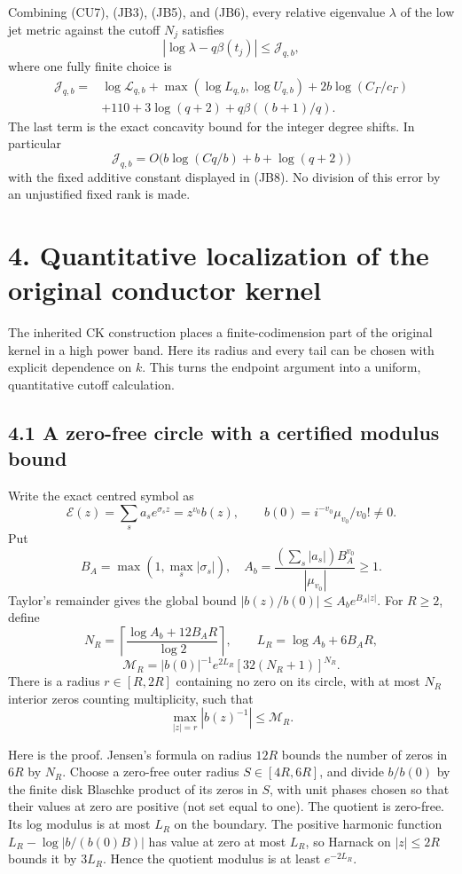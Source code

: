 \documentclass[10pt]{article}
\begin{document}
Combining (CU7), (JB3), (JB5), and (JB6), every relative eigenvalue \(\lambda\) of the low jet metric against the cutoff \(N_j\) satisfies \[
 \boxed{|\log\lambda-q\beta(t_j)|\le\mathcal J_{q,b},}
 \tag{JB7}
\] where one fully finite choice is \[
 \begin{split}
 \mathcal J_{q,b}={}&\log\mathcal L_{q,b}
 +\max(\log L_{q,b},\log U_{q,b})
 +2b\log(C_\Gamma/c_\Gamma)\\
 &+110+3\log(q+2)+q\beta((b+1)/q).
 \end{split}
 \tag{JB8}
\] The last term is the exact concavity bound for the integer degree shifts. In particular \[
 \mathcal J_{q,b}
 =O\bigl(b\log(Cq/b)+b+\log(q+2)\bigr)
\] with the fixed additive constant displayed in (JB8). No division of this error by an unjustified fixed rank is made.

\section{4. Quantitative localization of the original conductor kernel}\label{quantitative-localization-of-the-original-conductor-kernel}

The inherited CK construction places a finite-codimension part of the original kernel in a high power band. Here its radius and every tail can be chosen with explicit dependence on \(k\). This turns the endpoint argument into a uniform, quantitative cutoff calculation.

\subsection{4.1 A zero-free circle with a certified modulus bound}\label{a-zero-free-circle-with-a-certified-modulus-bound}

Write the exact centred symbol as \[
 \mathcal E(z)=\sum_s a_se^{\sigma_sz}=z^{v_0}b(z),
 \qquad b(0)=i^{-v_0}\mu_{v_0}/v_0!\ne0.
\] Put \[
 B_A=\max(1,\max_s|\sigma_s|),\quad
 A_b=\frac{(\sum_s|a_s|)B_A^{v_0}}{|\mu_{v_0}|}\ge1.
\] Taylor's remainder gives the global bound \(|b(z)/b(0)|\le A_b e^{B_A|z|}\). For \(R\ge2\), define \[
 N_R=\left\lceil\frac{\log A_b+12B_AR}{\log2}\right\rceil,
 \qquad L_R=\log A_b+6B_AR,
\] \[
 \boxed{\mathcal M_R=|b(0)|^{-1}e^{2L_R}
 [32(N_R+1)]^{N_R}.}
 \tag{LC1}
\] There is a radius \(r\in[R,2R]\) containing no zero on its circle, with at most \(N_R\) interior zeros counting multiplicity, such that \[
 \boxed{\max_{|z|=r}|b(z)^{-1}|\le\mathcal M_R.}
 \tag{LC2}
\]

Here is the proof. Jensen's formula on radius \(12R\) bounds the number of zeros in \(6R\) by \(N_R\). Choose a zero-free outer radius \(S\in[4R,6R]\), and divide \(b/b(0)\) by the finite disk Blaschke product of its zeros in \(S\), with unit phases chosen so that their values at zero are positive (not set equal to one). The quotient is zero-free. Its log modulus is at most \(L_R\) on the boundary. The positive harmonic function \(L_R-\log|b/(b(0)B)|\) has value at zero at most \(L_R\), so Harnack on \(|z|\le2R\) bounds it by \(3L_R\). Hence the quotient modulus is at least \(e^{-2L_R}\).
\end{document}

